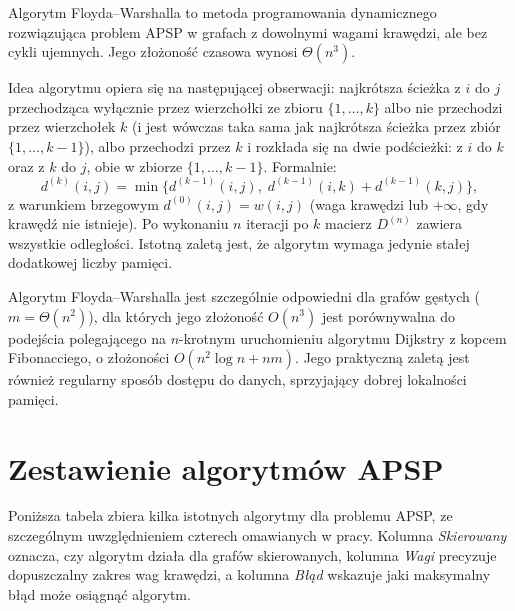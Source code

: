 Algorytm Floyda--Warshalla \cite{Floyd1962} to metoda programowania dynamicznego rozwiązująca problem APSP w grafach z dowolnymi wagami krawędzi, ale bez cykli ujemnych. Jego złożoność czasowa wynosi $\Theta(n^3)$.
 
Idea algorytmu opiera się na następującej obserwacji: najkrótsza ścieżka z $i$ do $j$ przechodząca wyłącznie przez wierzchołki ze zbioru $\{1, \ldots, k\}$ albo nie przechodzi przez wierzchołek $k$ (i jest wówczas taka sama jak najkrótsza ścieżka przez zbiór $\{1, \ldots, k-1\}$), albo przechodzi przez $k$ i rozkłada się na dwie podścieżki: z $i$ do $k$ oraz z $k$ do $j$, obie w zbiorze $\{1, \ldots, k-1\}$. Formalnie:
\[
d^{(k)}(i,j) = \min\{d^{(k-1)}(i,j),\; d^{(k-1)}(i,k) + d^{(k-1)}(k,j)\},
\]
z warunkiem brzegowym $d^{(0)}(i,j) = w(i,j)$ (waga krawędzi lub $+\infty$, gdy krawędź nie istnieje). Po wykonaniu $n$ iteracji po $k$ macierz $D^{(n)}$ zawiera wszystkie odległości. Istotną zaletą jest, że algorytm wymaga jedynie stałej dodatkowej liczby pamięci.
 
Algorytm Floyda--Warshalla jest szczególnie odpowiedni dla grafów gęstych ($m = \Theta(n^2)$), dla których jego złożoność $O(n^3)$ jest porównywalna do podejścia polegającego na $n$-krotnym uruchomieniu algorytmu Dijkstry z kopcem Fibonacciego, o złożoności $O(n^2 \log n + nm)$. Jego praktyczną zaletą jest również regularny sposób dostępu do danych, sprzyjający dobrej lokalności pamięci.

 
\section{Zestawienie algorytmów APSP}
 
Poniższa tabela zbiera kilka istotnych algorytmy dla problemu APSP, ze szczególnym uwzględnieniem czterech omawianych w pracy. Kolumna \emph{Skierowany} oznacza, czy algorytm działa dla grafów skierowanych, kolumna \emph{Wagi} precyzuje dopuszczalny zakres wag krawędzi, a kolumna \emph{Błąd} wskazuje jaki maksymalny błąd może osiągnąć algorytm.
 
